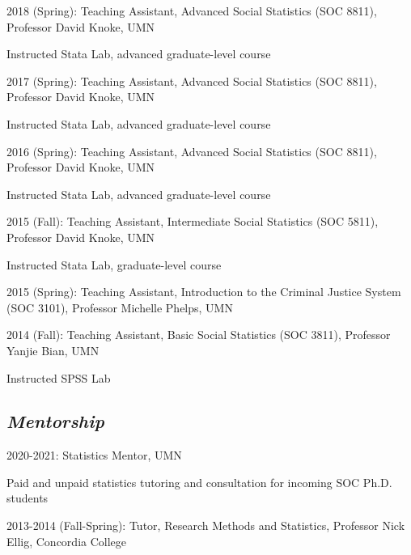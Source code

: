 \documentclass[letterpaper]{article}
\renewenvironment{itemize}{
  \begin{list}{}{
    \setlength{\leftmargin}{1.5em}
  }
}{
  \end{list}
}
\begin{document}
\begin{itemize}

\item 2018 (Spring): Teaching Assistant, Advanced Social Statistics (SOC 8811), Professor David Knoke, UMN
       \begin{itemize}
	\item Instructed Stata Lab, advanced graduate-level course
	\end{itemize}

\item 2017 (Spring): Teaching Assistant, Advanced Social Statistics (SOC 8811), Professor David Knoke, UMN
       \begin{itemize}
	\item Instructed Stata Lab, advanced graduate-level course
	\end{itemize}

\item 2016 (Spring): Teaching Assistant, Advanced Social Statistics (SOC 8811), Professor David Knoke, UMN
        \begin{itemize}
	\item Instructed Stata Lab, advanced graduate-level course
	\end{itemize}

\item 2015 (Fall): Teaching Assistant, Intermediate Social Statistics (SOC 5811), Professor David Knoke, UMN
        \begin{itemize}
	\item Instructed Stata Lab, graduate-level course
	\end{itemize}

\item 2015 (Spring): Teaching Assistant, Introduction to the Criminal Justice System (SOC 3101), Professor Michelle Phelps, UMN

\item 2014 (Fall): Teaching Assistant, Basic Social Statistics (SOC 3811), Professor Yanjie Bian, UMN
        \begin{itemize}
	\item Instructed SPSS Lab
	\end{itemize} 
\end{itemize}

\subsection*{\textit{Mentorship}}
        \begin{itemize}

\item 2020-2021: Statistics Mentor, UMN
       \begin{itemize}
	\item Paid and unpaid statistics tutoring and consultation for incoming SOC Ph.D. students
	\end{itemize}

\item 2013-2014 (Fall-Spring): Tutor, Research Methods and Statistics, Professor Nick Ellig, Concordia College
         \end{itemize}
\end{document}
